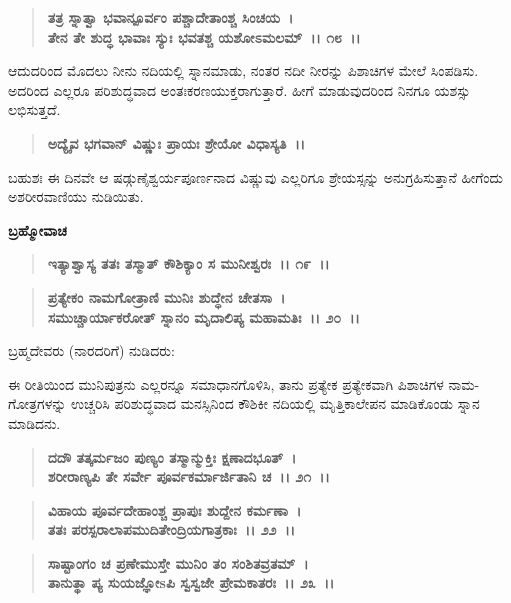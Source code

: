 \begin{verse}
\textbf{ತತ್ರ ಸ್ನಾತ್ವಾ ಭವಾನ್ಪೂರ್ವಂ ಪಶ್ಚಾದೇತಾಂಶ್ಚ ಸಿಂಚಯ~।}\\\textbf{ತೇನ ತೇ ಶುದ್ಧ ಭಾವಾಃ ಸ್ಯುಃ ಭವತಶ್ಚ ಯಶೋಽಮಲಮ್~।। ೧೮~।।}
\end{verse}

ಆದುದರಿಂದ ಮೊದಲು ನೀನು ನದಿಯಲ್ಲಿ ಸ್ನಾನಮಾಡು, ನಂತರ ನದೀ ನೀರನ್ನು ಪಿಶಾಚಿಗಳ ಮೇಲೆ ಸಿಂಪಡಿಸು. ಅದರಿಂದ ಎಲ್ಲರೂ ಪರಿಶುದ್ಧವಾದ ಅಂತಃಕರಣಯುಕ್ತ\-ರಾಗುತ್ತಾರೆ. ಹೀಗೆ ಮಾಡುವುದರಿಂದ ನಿನಗೂ ಯಶಸ್ಸು ಲಭಿಸುತ್ತದೆ.

\begin{verse}
\textbf{ಅದ್ಯೈವ ಭಗವಾನ್ ವಿಷ್ಣುಃ ಪ್ರಾಯಃ ಶ್ರೇಯೋ ವಿಧಾಸ್ಯತಿ~।।}
\end{verse}

ಬಹುಶಃ ಈ ದಿನವೇ ಆ ಷಡ್ಗುಣೈಶ್ವರ್ಯಪೂರ್ಣನಾದ ವಿಷ್ಣುವು ಎಲ್ಲರಿಗೂ ಶ್ರೇಯಸ್ಸನ್ನು ಅನುಗ್ರಹಿಸುತ್ತಾನೆ \enginline{-} ಹೀಗೆಂದು ಅಶರೀರವಾಣಿಯು ನುಡಿಯಿತು.

\begin{flushleft}
\textbf{ಬ್ರಹ್ಮೋವಾಚ\enginline{-}}
\end{flushleft}

\begin{verse}
\textbf{ಇತ್ಯಾಶ್ವಾಸ್ಯ ತತಃ ತಸ್ಮಾತ್ ಕೌಶಿಕ್ಯಾಂ ಸ ಮುನೀಶ್ವರಃ~।। ೧೯~।।} 
\end{verse}

\begin{verse}
\textbf{ಪ್ರತ್ಯೇಕಂ ನಾಮಗೋತ್ರಾಣಿ ಮುನಿಃ ಶುದ್ಧೇನ ಚೇತಸಾ~।}\\\textbf{ಸಮುಚ್ಚಾರ್ಯಾಕರೋತ್ ಸ್ನಾನಂ ಮೃದಾಲಿಪ್ಯ ಮಹಾಮತಿಃ~।। ೨೦~।।}
\end{verse}

ಬ್ರಹ್ಮದೇವರು (ನಾರದರಿಗೆ) ನುಡಿದರು:

ಈ ರೀತಿಯಿಂದ ಮುನಿಪುತ್ರನು ಎಲ್ಲರನ್ನೂ ಸಮಾಧಾನಗೊಳಿಸಿ, ತಾನು ಪ್ರತ್ಯೇಕ ಪ್ರತ್ಯೇಕವಾಗಿ ಪಿಶಾಚಿಗಳ ನಾಮ-ಗೋತ್ರಗಳನ್ನು ಉಚ್ಚರಿಸಿ ಪರಿಶುದ್ಧವಾದ ಮನಸ್ಸಿನಿಂದ ಕೌಶಿಕೀ ನದಿಯಲ್ಲಿ ಮೃತ್ತಿಕಾಲೇಪನ ಮಾಡಿಕೊಂಡು ಸ್ನಾನ ಮಾಡಿದನು.

\begin{verse}
\textbf{ದದೌ ತತ್ಕರ್ಮಜಂ ಪುಣ್ಯಂ ತಸ್ಮಾನ್ಮುಕ್ತಿಃ ಕ್ಷಣಾದಭೂತ್~।}\\\textbf{ಶರೀರಾಣ್ಯಪಿ ತೇ ಸರ್ವೇ ಪೂರ್ವಕರ್ಮಾರ್ಜಿತಾನಿ ಚ~।। ೨೧~।। }
\end{verse}

\begin{verse}
\textbf{ವಿಹಾಯ ಪೂರ್ವದೇಹಾಂಶ್ಚ ಪ್ರಾಪುಃ ಶುದ್ದೇನ ಕರ್ಮಣಾ~।}\\\textbf{ತತಃ ಪರಸ್ಪರಾಲಾಪಮುದಿತೇಂದ್ರಿಯಗಾತ್ರಕಾಃ~।। ೨೨~।। }
\end{verse}

\begin{verse}
\textbf{ಸಾಷ್ಟಾಂಗಂ ಚ ಪ್ರಣೇಮುಸ್ತೇ ಮುನಿಂ ತಂ ಸಂಶಿತವ್ರತಮ್~।}\\\textbf{ತಾನುತ್ಥಾ ಪ್ಯ ಸುಯಜ್ಞೋsಪಿ ಸ್ವಸ್ವಜೇ ಪ್ರೇಮಕಾತರಃ~।। ೨೩~।।}
\end{verse}

